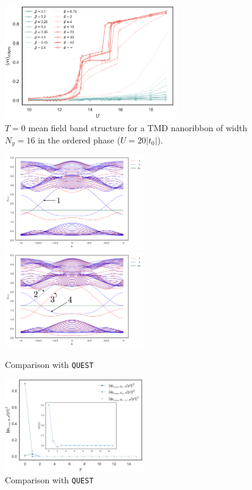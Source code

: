 \begin{figure}[H]
\centering
\includegraphics[width = 7.5cm]{images/edge-mag-phase-diagram.png}
	\caption[$T=0$ mean field band structure for a TMD nanoribbon of width $N_y = 16$ in the ordered phase, at $U=20 | t_0 |$.]{$T=0$ mean field band structure for a TMD nanoribbon of width $N_y = 16$ in the ordered phase ($U=20 | t_0 |$).}
	\label{fig:bandsZoomed}
\end{figure}
\begin{figure}[H]
    \includegraphics[width=6cm]{images/bands152.png}
  \includegraphics[width=6cm]{images/bands154.png}
  \caption{Comparison with \texttt{QUEST}}
  \label{fig:blade_flow_pressure}
\end{figure}
\begin{figure}[H]
  \centering
  \includegraphics[width=6cm]{images/topEdgeMagProfU13.png}
  \caption{Comparison with \texttt{QUEST}}
  \label{fig:blade_flow_pressure}
\end{figure}
